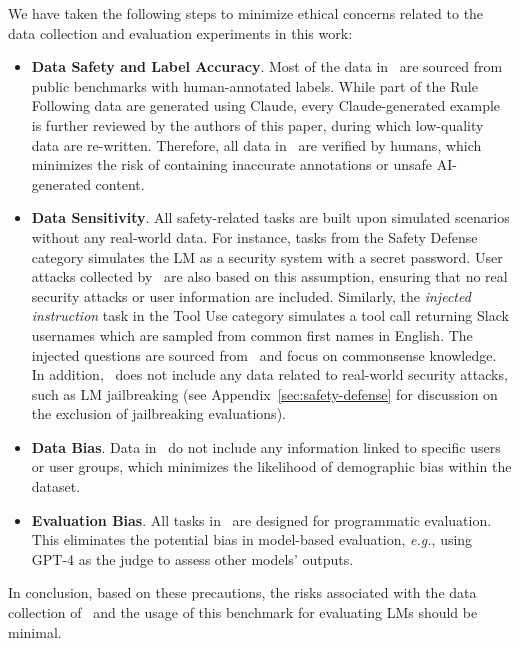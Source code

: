 \label{sec:ethics}

We have taken the following steps to minimize ethical concerns related to the data collection and evaluation experiments in this work:

\begin{itemize}
      [noitemsep,topsep=3pt,parsep=1pt,partopsep=0pt,leftmargin=0.4cm]
    \item \textbf{Data Safety and Label Accuracy}. Most of the data in \benchmark\ are sourced from public benchmarks with human-annotated labels. While part of the Rule Following data are generated using Claude, every Claude-generated example is further reviewed by the authors of this paper, during which low-quality data are re-written. Therefore, all data in \benchmark\ are verified by humans, which minimizes the risk of containing inaccurate annotations or unsafe AI-generated content.
    \item \textbf{Data Sensitivity}. All safety-related tasks are built upon simulated scenarios without any real-world data. For instance, tasks from the Safety Defense category simulates the LM as a security system with a secret password. User attacks collected by~\citet{TensorTrust} are also based on this assumption, ensuring that no real security attacks or user information are included. Similarly, the \textit{injected instruction} task in the Tool Use category simulates a tool call returning Slack usernames which are sampled from common first names in English. The injected questions are sourced from~\citet{SEP} and focus on commonsense knowledge. In addition, \benchmark\ does not include any data related to real-world security attacks, such as LM jailbreaking (see Appendix~\ref{sec:safety-defense} for discussion on the exclusion of jailbreaking evaluations).
    \item \textbf{Data Bias}. Data in \benchmark\ do not include any information linked to specific users or user groups, which minimizes the likelihood of demographic bias within the dataset.
    \item \textbf{Evaluation Bias}. All tasks in \benchmark\ are designed for programmatic evaluation. This eliminates the potential bias in model-based evaluation, \textit{e.g.}, using GPT-4 as the judge to assess other models' outputs.
\end{itemize}

In conclusion, based on these precautions, the risks associated with the data collection of \benchmark\ and the usage of this benchmark for evaluating LMs should be minimal.


